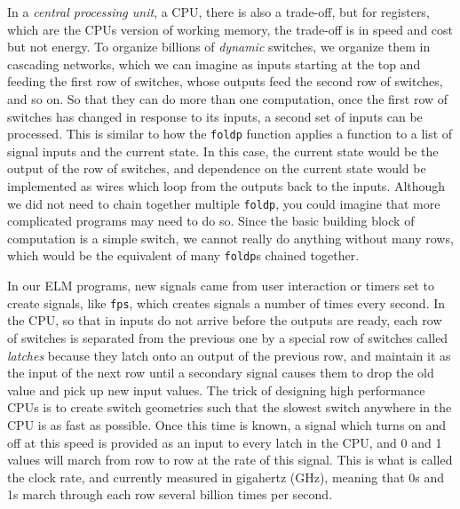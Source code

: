 \documentclass[12pt]{amsbook}
\begin{document}
{\medskip
In a \emph{central processing unit}, a CPU,
there is also a trade-off, but for registers,
which are the CPUs version of working memory,
the trade-off is in speed and cost but not energy. 
To organize billions of \emph{dynamic} switches,
we organize them in cascading networks,
which we can imagine as inputs starting at the 
top and feeding the first row of switches,
whose outputs feed the second row of switches,
and so on.
So that they can do more than one computation,
once the first row of switches has changed in response to its inputs, a second set of inputs can be processed.
This is similar to how the \texttt{foldp} function applies a function to a list of signal inputs and the current state.
In this case, the current state would be the output of the row of switches, 
and dependence on the current state would be implemented as wires which loop from the outputs back to the inputs.
Although we did not need to chain together multiple \texttt{foldp},
you could imagine that more complicated programs may need to do so.
Since the basic building block of computation is a simple switch,
we cannot really do anything without many rows,
which would be the equivalent of many \texttt{foldp}s chained together.

In our ELM programs, new signals came from user interaction or timers set to create signals, like \texttt{fps}, which creates signals a number of times every second.
In the CPU, so that in inputs do not arrive before the outputs are ready,
each row of switches is separated from the previous one by a special row of switches called \emph{latches} because they latch onto an output of the previous row, and maintain it as the input of the next row until a secondary signal causes them to drop the old value and pick up new input values.
The trick of designing high performance CPUs is to create switch geometries such that the slowest switch anywhere in the CPU is as fast as possible.
Once this time is known, a signal which turns on and off at this speed is provided as an input to every latch in the CPU, 
and 0 and 1 values will march from row to row at the rate of this signal.
This is what is called the clock rate, and currently measured in gigahertz (GHz), meaning that 0s and 1s march through each row several billion times per second.

}
\end{document}
